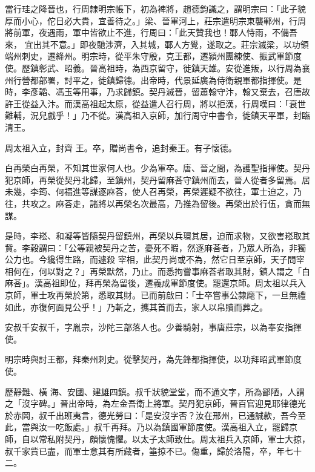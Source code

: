 \begin{pinyinscope}
 當行珪之降晉也，行周隸明宗帳下，初為裨將，趙德鈞識之，謂明宗曰：「此子貌厚而小心，佗日必大貴，宜善待之。」梁、晉軍河上，莊宗遣明宗東襲鄆州，行周將前軍，夜遇雨，軍中皆欲止不進，行周曰：「此天贊我也！鄆人恃雨，不備吾來，
 宜出其不意。」即夜馳涉濟，入其城，鄆人方覺，遂取之。莊宗滅梁，以功領端州刺史，遷絳州。明宗時，從平朱守殷，克王都，遷潁州團練使、振武軍節度使。歷鎮彰武、昭義。晉高祖時，為西京留守，徙鎮天雄。安從進叛，以行周為襄州行營都部署，討平之，徙鎮歸德。出帝時，代景延廣為侍衛親軍都指揮使。是時，李彥韜、馮玉等用事，乃求歸鎮。契丹滅晉，留蕭翰守汴，翰又棄去，召唐故許王從益入汴。而漢高祖起太原，從益遣人召行周，將以拒漢，行周嘆曰：「衰世難輔，況兒戲乎！」乃不從。漢高祖入京師，加行周守中書令，徙鎮天平軍，封臨清王。



 周太祖入立，封齊
 王。卒，贈尚書令，追封秦王。有子懷德。



 白再榮白再榮，不知其世家何人也。少為軍卒。唐、晉之間，為護聖指揮使。契丹犯京師，再榮從契丹北歸，至鎮州，契丹留麻荅守鎮州而去，晉人從者多留焉。居未幾，李筠、何福進等謀逐麻荅，使人召再榮，再榮遲疑不欲往，軍士迫之，乃往，共攻之。麻荅走，諸將以再榮名次最高，乃推為留後。再榮出於行伍，貪而無謀。



 是時，李崧、和凝等皆隨契丹留鎮州，再榮以兵環其居，迫而求物，又欲害崧取其貲。李穀謂曰：「公等親被契丹之苦，憂死不暇，然逐麻荅者，乃眾人所為，非獨公力也。今纔得生路，而遽殺
 宰相，此契丹尚或不為，然它日至京師，天子問宰相何在，何以對之？」再榮默然，乃止。而悉拘嘗事麻荅者取其財，鎮人謂之「白麻荅」。漢高祖即位，拜再榮為留後，遷義成軍節度使。罷還京師。周太祖以兵入京師，軍士攻再榮於第，悉取其財。已而前啟曰：「士卒嘗事公隸麾下，一旦無禮如此，亦復何面見公乎！」乃斬之，攜其首而去，家人以帛贖而葬之。



 安叔千安叔千，字胤宗，沙陀三部落人也。少善騎射，事唐莊宗，以為奉安指揮使。



 明宗時與討王都，拜秦州刺史。從擊契丹，為先鋒都指揮使，以功拜昭武軍節度使。



 歷靜難、橫
 海、安國、建雄四鎮。叔千狀貌堂堂，而不通文字，所為鄙陋，人謂之「沒字碑。」晉出帝時，為左金吾衛上將軍。契丹犯京師，晉百官迎見耶律德光於赤岡，叔千出班夷言，德光勞曰：「是安沒字否？汝在邢州，已通誠款，吾今至此，當與汝一吃飯處。」叔千再拜。乃以為鎮國軍節度使。漢高祖入立，罷歸京師，自以常私附契丹，頗懷愧懼。以太子太師致仕。周太祖兵入京師，軍士大掠，叔千家貲已盡，而軍士意其有所藏者，箠掠不已。傷重，歸於洛陽，卒，年七十二。



\end{pinyinscope}